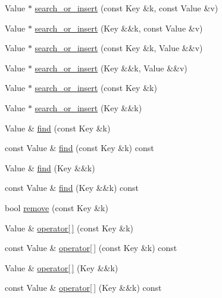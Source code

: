 \begin{DoxyCompactItemize}
Value $\ast$ \hyperlink{class_designar_1_1_gen_map_a204d7e2d2d8d97cec886e60f4d4d22ec}{search\+\_\+or\+\_\+insert} (const Key \&k, const Value \&v)
\item 
Value $\ast$ \hyperlink{class_designar_1_1_gen_map_a12c2b26187291c9553ff36e8c00bce4b}{search\+\_\+or\+\_\+insert} (Key \&\&k, const Value \&v)
\item 
Value $\ast$ \hyperlink{class_designar_1_1_gen_map_a17eac83eb57f8181aaaeeda18d155f31}{search\+\_\+or\+\_\+insert} (const Key \&k, Value \&\&v)
\item 
Value $\ast$ \hyperlink{class_designar_1_1_gen_map_a3244d12da4c9186ea2c1eef6ad0cbdc9}{search\+\_\+or\+\_\+insert} (Key \&\&k, Value \&\&v)
\item 
Value $\ast$ \hyperlink{class_designar_1_1_gen_map_a4ccec29a17c547692c25f3185187d7bd}{search\+\_\+or\+\_\+insert} (const Key \&k)
\item 
Value $\ast$ \hyperlink{class_designar_1_1_gen_map_ae2ab69b26f782abcd99f99944253d8de}{search\+\_\+or\+\_\+insert} (Key \&\&k)
\item 
Value \& \hyperlink{class_designar_1_1_gen_map_ad768d9e00839f4d328a1394ffc806d83}{find} (const Key \&k)
\item 
const Value \& \hyperlink{class_designar_1_1_gen_map_a0df2bf3aab592ee2343bc2855839bc96}{find} (const Key \&k) const
\item 
Value \& \hyperlink{class_designar_1_1_gen_map_ae02aaa8835abada7b361da281c6125bf}{find} (Key \&\&k)
\item 
const Value \& \hyperlink{class_designar_1_1_gen_map_a746797ad728a5e2aeefee11a8732a48f}{find} (Key \&\&k) const
\item 
bool \hyperlink{class_designar_1_1_gen_map_a9d4608ebd3b589a6989d838979a7b2e7}{remove} (const Key \&k)
\item 
Value \& \hyperlink{class_designar_1_1_gen_map_a994a7afc52e7421661f2eed7c03e6ae7}{operator\mbox{[}$\,$\mbox{]}} (const Key \&k)
\item 
const Value \& \hyperlink{class_designar_1_1_gen_map_abff00b60a0488eb655696942069eacbc}{operator\mbox{[}$\,$\mbox{]}} (const Key \&k) const
\item 
Value \& \hyperlink{class_designar_1_1_gen_map_a5e5732a2812ff86e6c5e68f26012cc9c}{operator\mbox{[}$\,$\mbox{]}} (Key \&\&k)
\item 
const Value \& \hyperlink{class_designar_1_1_gen_map_ac28a9a47f9d373466fe64c6a16105e74}{operator\mbox{[}$\,$\mbox{]}} (Key \&\&k) const
\end{DoxyCompactItemize}


